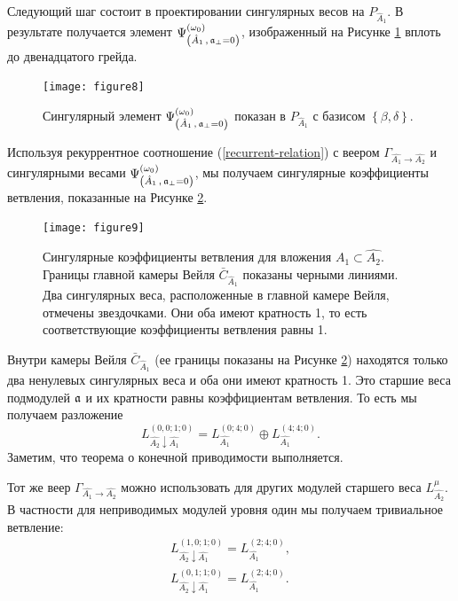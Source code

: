 Следующий шаг состоит в проектировании сингулярных весов на $P_{\hat A_1}$. В результате получается элемент $\Psi ^{\left( \omega_0 \right) }_{\left(  \hat A_1\, , \, \mathfrak{a}_{\perp}=0 \right)}$, изображенный на Рисунке \ref{fig:AffineA2_A1_anom_proj} вплоть до двенадцатого грейда.
\begin{figure}[h!tb]
  \centering
  \texttt{[image: figure8]}
  \caption{Сингулярный элемент $\Psi ^{\left( \omega_0 \right) }_{\left(  \hat A_1\, , \, \mathfrak{a}_{\perp}=0 \right)}$ показан в $P_{\hat A_1}$ с базисом $\left\{\beta,\delta \right\}$.}
  \label{fig:AffineA2_A1_anom_proj}
\end{figure}

Используя рекуррентное соотношение  (\ref{recurrent-relation}) с веером
$\Gamma_{\hat{A_1}\rightarrow \hat{A_2}}$ и сингулярными весами $\Psi ^{\left( \omega_0 \right) }_{\left(  \hat A_1\, , \, \mathfrak{a}_{\perp}=0 \right)}$, мы получаем сингулярные коэффициенты ветвления, показанные на Рисунке \ref{fig:AffineA2_A1_branching}.
\begin{figure}[h!tb]
  \centering
  \texttt{[image: figure9]}
  \caption{Сингулярные коэффициенты ветвления для вложения $\hat{A_1}\subset \hat{A_2}$. Границы главной камеры Вейля $\bar{C}_{\hat{A}_1}$ показаны черными линиями. Два сингулярных веса, расположенные в главной камере Вейля, отмечены звездочками. Они оба имеют кратность 1, то есть соответствующие коэффициенты ветвления равны 1.}
  \label{fig:AffineA2_A1_branching}
\end{figure}
Внутри камеры Вейля $\bar{C}_{\hat{A}_1}$ (ее границы показаны на Рисунке \ref{fig:AffineA2_A1_branching}) находятся только два ненулевых сингулярных веса и оба они имеют кратность 1. Это старшие веса подмодулей $\mathfrak{a}$ и их кратности равны коэффициентам ветвления. То есть мы получаем разложение
\begin{equation*}
  \label{eq:43}
  L^{(0,0;1;0)}_{\hat{A_2}\downarrow \hat{A_1}}= L_{\hat{A_1}}^{(0;4;0)}\oplus L_{\hat{A_1}}^{(4;4;0)}.
\end{equation*}
Заметим, что теорема о конечной приводимости выполняется.

Тот же веер $\Gamma_{\hat{A_1}\rightarrow \hat{A_2}}$ можно использовать для других модулей старшего веса $L^{\mu}_{\hat{A_2}}$. В частности для неприводимых модулей уровня один мы получаем тривиальное ветвление:
\begin{eqnarray*}
  \label{eq:44}
   L^{(1,0;1;0)}_{\hat{A_2}\downarrow \hat{A_1}}= L_{\hat{A_1}}^{(2;4;0)},\\
   L^{(0,1;1;0)}_{\hat{A_2}\downarrow \hat{A_1}}= L_{\hat{A_1}}^{(2;4;0)}.
\end{eqnarray*}


